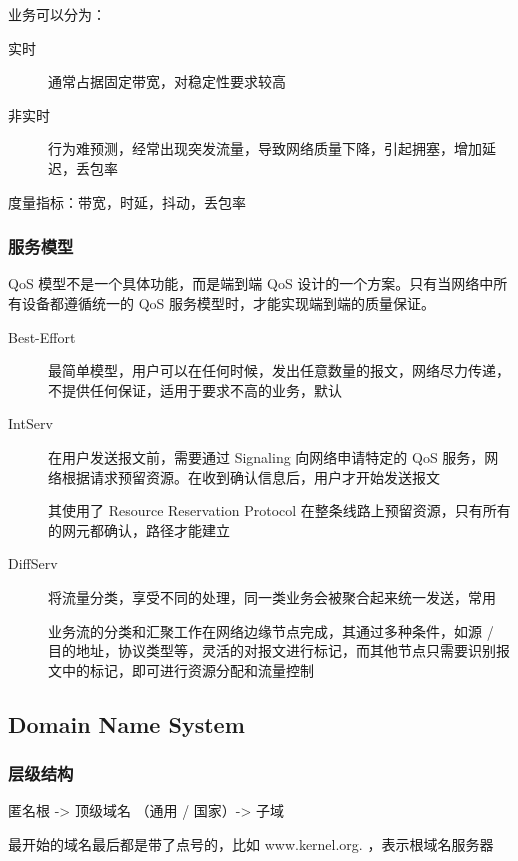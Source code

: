 \documentclass[11pt,journal,compsoc]{IEEEtran}
\begin{document}
业务可以分为：

\begin{description}
    \item[实时] 通常占据固定带宽，对稳定性要求较高

    \item[非实时] 行为难预测，经常出现突发流量，导致网络质量下降，引起拥塞，增加延迟，丢包率
\end{description}

度量指标：带宽，时延，抖动，丢包率


\subsubsection{服务模型}

QoS 模型不是一个具体功能，而是端到端 QoS 设计的一个方案。只有当网络中所有设备都遵循统一的 QoS 服务模型时，才能实现端到端的质量保证。

\begin{description}
    \item[Best-Effort] 最简单模型，用户可以在任何时候，发出任意数量的报文，网络尽力传递，不提供任何保证，适用于要求不高的业务，默认

    \item[IntServ] 在用户发送报文前，需要通过 Signaling 向网络申请特定的 QoS 服务，网络根据请求预留资源。在收到确认信息后，用户才开始发送报文

    其使用了 Resource Reservation Protocol 在整条线路上预留资源，只有所有的网元都确认，路径才能建立

    \item[DiffServ] 将流量分类，享受不同的处理，同一类业务会被聚合起来统一发送，常用

    业务流的分类和汇聚工作在网络边缘节点完成，其通过多种条件，如源 / 目的地址，协议类型等，灵活的对报文进行标记，而其他节点只需要识别报文中的标记，即可进行资源分配和流量控制
\end{description}


\subsection{Domain Name System}


\subsubsection{层级结构}

匿名根 -> 顶级域名 （通用 / 国家）-> 子域

最开始的域名最后都是带了点号的，比如 www.kernel.org. ，表示根域名服务器
\end{document}
